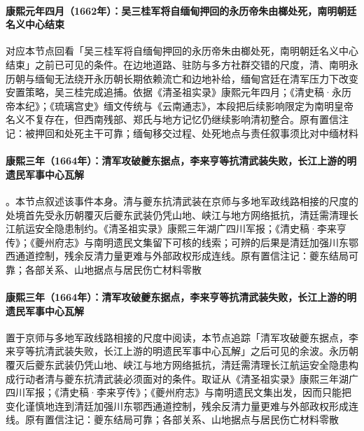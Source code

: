 \paragraph{康熙元年四月（1662年）：吴三桂军将自缅甸押回的永历帝朱由榔处死，南明朝廷名义中心结束}
 对应本节点回看「吴三桂军将自缅甸押回的永历帝朱由榔处死，南明朝廷名义中心结束」之前已可见的条件。在边地道路、驻防与多方社群交错的尺度，清、南明永历朝与缅甸无法绕开永历朝长期依赖流亡和边地补给，缅甸宫廷在清军压力下改变安置策略，吴三桂完成追捕。依据《清圣祖实录》康熙元年四月；《清史稿·永历帝本纪》；《琉璃宫史》缅文传统与《云南通志》，本段把后续影响限定为南明皇帝名义不复存在，但西南残部、郑氏与地方记忆仍继续影响清初整合。原有置信注记：被押回和处死主干可靠；缅甸移交过程、处死地点与责任叙事须比对中缅材料

\paragraph{康熙三年（1664年）：清军攻破夔东据点，李来亨等抗清武装失败，长江上游的明遗民军事中心瓦解}
。本节点叙述该事件本身。清与夔东抗清武装在京师与多地军政线路相接的尺度的处境首先受永历朝覆灭后夔东武装仍凭山地、峡江与地方网络抵抗，清廷需清理长江航运安全隐患制约。《清圣祖实录》康熙三年湖广四川军报；《清史稿·李来亨传》；《夔州府志》与南明遗民文集留下可核的线索；可辨的后果是清廷加强川东鄂西通道控制，残余反清力量更难与外部政权形成连线。原有置信注记：夔东结局可靠；各部关系、山地据点与居民伤亡材料零散

\paragraph{康熙三年（1664年）：清军攻破夔东据点，李来亨等抗清武装失败，长江上游的明遗民军事中心瓦解}
 置于京师与多地军政线路相接的尺度中阅读，本节点追踪「清军攻破夔东据点，李来亨等抗清武装失败，长江上游的明遗民军事中心瓦解」之后可见的余波。永历朝覆灭后夔东武装仍凭山地、峡江与地方网络抵抗，清廷需清理长江航运安全隐患构成行动者清与夔东抗清武装必须面对的条件。取证从《清圣祖实录》康熙三年湖广四川军报；《清史稿·李来亨传》；《夔州府志》与南明遗民文集出发，因而只能把变化谨慎地连到清廷加强川东鄂西通道控制，残余反清力量更难与外部政权形成连线。原有置信注记：夔东结局可靠；各部关系、山地据点与居民伤亡材料零散

